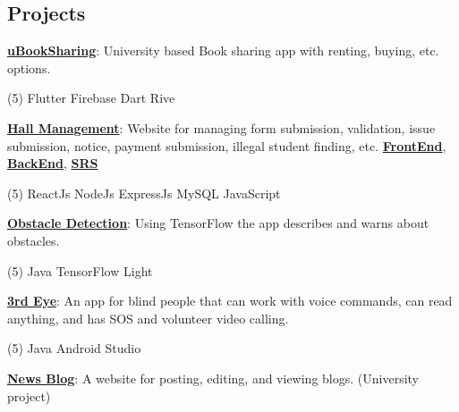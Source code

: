 \documentclass[mm]{simple_style}
\let\oldhref\href
\renewcommand{\href}[2]{\oldhref{#1}{\bfseries#2}}
\begin{document}
\begin{resume}
\section{Projects}
{\href{https://github.com/Sourav9063/uBookSharing}{uBookSharing}}: University based Book sharing app with renting, buying, etc. options.\\
\vspace{-4mm}
\begin{tasks}[style=itemize ,label=\textcolor{gray}{$\bullet$}](5)
\task Flutter
\task Firebase
\task Dart
\task Rive
\end{tasks}
\vspace{-2mm}
\href{https://sourav9063.github.io/hall_management_rf/}{Hall Management}: Website for managing form submission, validation, issue submission, notice, payment submission, illegal student finding, etc. \href{https://github.com/Sourav9063/hall_management_rf}{FrontEnd}, \href{https://github.com/Sourav9063/Backend_hall_management}{BackEnd},
\href{https://docs.google.com/document/d/1Sy9VO97rWJrOYCMgWRGJz4H2q3vJPSVCpLRm5AUOsO8/edit?usp=sharing}{SRS}\\
\vspace{-4mm}
\begin{tasks}[style=itemize ,label=\textcolor{gray}{$\bullet$}](5)
\task ReactJs 
\task NodeJs
\task ExpressJs
\task MySQL 
\task JavaScript
\end{tasks}
\vspace{-2mm}
\href{https://github.com/Sourav9063/obstacles_detection}{Obstacle Detection}: Using TensorFlow the app describes and warns about obstacles.\\
\vspace{-4mm}
\begin{tasks}[style=itemize ,label=\textcolor{gray}{$\bullet$}](5)
\task Java
\task TensorFlow Light
\end{tasks}
\vspace{-2mm}
\href{https://github.com/Sourav9063/3rdEye}{3rd Eye}: An app for blind people that can work with voice commands, can read anything, and has SOS and volunteer video calling.
\vspace{-4mm}
\begin{tasks}[style=itemize ,label=\textcolor{gray}{$\bullet$}](5)
\task[] \hspace
\task[] \hspace
\task Java
\task Android Studio
\end{tasks}
\vspace{-2mm}
\href{https://github.com/Sourav9063/Blog-CRUD-by-Nodejs}{News Blog}: A website for posting, editing, and viewing blogs. (University project)\\

\end{resume}
\end{document}
